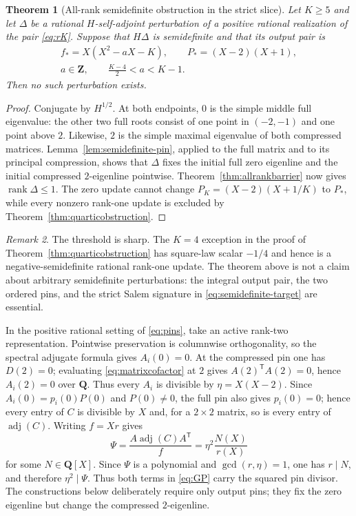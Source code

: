 \documentclass[11pt,reqno]{amsart}
\newtheorem{theorem}{Theorem}[section]
\theoremstyle{definition}
\theoremstyle{remark}
\newtheorem{remark}[theorem]{Remark}
\DeclareMathOperator{\adj}{adj}
\DeclareMathOperator{\rank}{rank}
\newcommand{\Q}{\mathbf Q}
\newcommand{\Z}{\mathbf Z}
\begin{document}
\begin{theorem}[All-rank semidefinite obstruction in the strict slice]
\label{thm:allrank-semidefinite}
Let $K\geq5$ and let $\Delta$ be a rational $H$-self-adjoint perturbation of
a positive rational realization of the pair \eqref{eq:rK}.  Suppose that
$H\Delta$ is semidefinite and that its output pair is
\begin{equation}\label{eq:semidefinite-target}
\begin{gathered}
 f_*=X(X^2-aX-K),\qquad P_*=(X-2)(X+1),\\
 a\in\Z,\qquad \frac{K-4}{2}<a<K-1.
\end{gathered}
\end{equation}
Then no such perturbation exists.
\end{theorem}

\begin{proof}
Conjugate by $H^{1/2}$.  At both endpoints, $0$ is the simple middle full
eigenvalue: the other two full roots consist of one point in $(-2,-1)$ and
one point above $2$.  Likewise, $2$ is the simple maximal eigenvalue of both
compressed matrices.  Lemma~\ref{lem:semidefinite-pin}, applied to the full
matrix and to its principal compression, shows that $\Delta$ fixes the
initial full zero eigenline and the initial compressed $2$-eigenline
pointwise.  Theorem~\ref{thm:allrankbarrier} now gives
$\rank\Delta\leq1$.  The zero update cannot change
$P_K=(X-2)(X+1/K)$ to $P_*$, while every nonzero rank-one update is excluded
by Theorem~\ref{thm:quarticobstruction}.
\end{proof}

\begin{remark}\label{rem:semidefinite-sharp}
The threshold is sharp.  The $K=4$ exception in the proof of
Theorem~\ref{thm:quarticobstruction} has square-law scalar $-1/4$ and hence
is a negative-semidefinite rational rank-one update.  The theorem above is
not a claim about arbitrary semidefinite perturbations: the integral output
pair, the two ordered pins, and the strict Salem signature in
\eqref{eq:semidefinite-target} are essential.
\end{remark}

In the positive rational setting of \eqref{eq:pins}, take an active rank-two
representation.  Pointwise preservation is columnwise orthogonality, so
the spectral adjugate formula gives $A_i(0)=0$.  At the compressed pin one
has $D(2)=0$; evaluating \eqref{eq:matrixcofactor} at $2$ gives
$A(2)^{\mathsf T}A(2)=0$, hence $A_i(2)=0$ over $\Q$.  Thus every $A_i$ is
divisible by $\eta=X(X-2)$.  Since $A_i(0)=p_i(0)P(0)$ and $P(0)\ne0$, the full
pin also gives $p_i(0)=0$; hence every entry of $C$ is divisible by $X$ and, for a
$2\times2$ matrix, so is every entry of $\adj(C)$.  Writing $f=Xr$ gives
\[
 \Psi=\frac{A\adj(C)A^{\mathsf T}}{f}
      =\eta^2\frac{N(X)}{r(X)}
\]
for some $N\in\Q[X]$.  Since $\Psi$ is a polynomial and
$\gcd(r,\eta)=1$, one has $r\mid N$, and therefore $\eta^2\mid\Psi$.
Thus both terms in \eqref{eq:GP} carry the squared pin divisor.  The
constructions below deliberately require only output pins; they fix the zero
eigenline but change the compressed $2$-eigenline.
\end{document}
